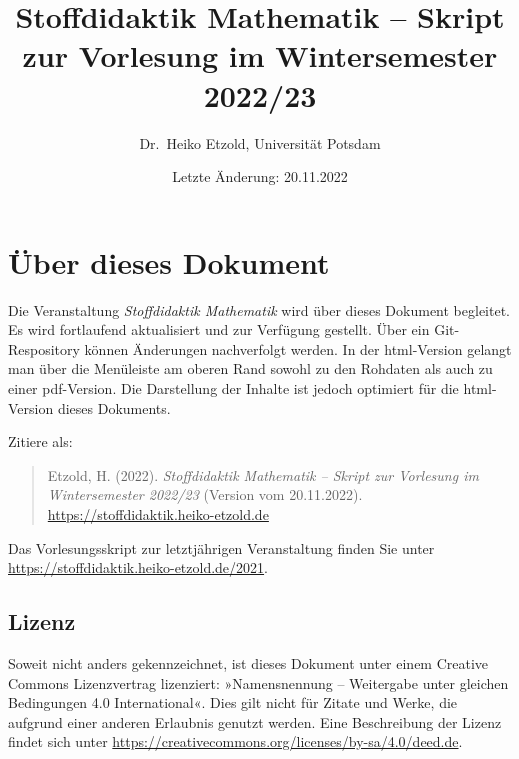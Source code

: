 \documentclass[
]{scrbook}
\title{Stoffdidaktik Mathematik -- Skript zur Vorlesung im Wintersemester 2022/23}
\author{Dr.~Heiko Etzold, Universität Potsdam}
\date{Letzte Änderung: 20.11.2022}
\makeatletter
\def\renewtheorem#1{%
  \expandafter\let\csname#1\endcsname\relax
  \expandafter\let\csname c@#1\endcsname\relax
  \gdef\renewtheorem@envname{#1}
  \renewtheorem@secpar
}
\def\renewtheorem@secpar{\@ifnextchar[{\renewtheorem@numberedlike}{\renewtheorem@nonumberedlike}}
\def\renewtheorem@numberedlike[#1]#2{\newtheorem{\renewtheorem@envname}[#1]{#2}}
\def\renewtheorem@nonumberedlike#1{
\def\renewtheorem@caption{#1}
\edef\renewtheorem@nowithin{\noexpand\newtheorem{\renewtheorem@envname}{\renewtheorem@caption}}
\renewtheorem@thirdpar
}
\def\renewtheorem@thirdpar{\@ifnextchar[{\renewtheorem@within}{\renewtheorem@nowithin}}
\def\renewtheorem@within[#1]{\renewtheorem@nowithin[#1]}
\theoremstyle{definition}
\theoremstyle{definition}
\theoremstyle{definition}
\theoremstyle{definition}
\theoremstyle{remark}
\makeatother
\begin{document}
\maketitle

% 

{
\hypersetup{linkcolor=}
\setcounter{tocdepth}{1}
\tableofcontents
}
\hypertarget{uxfcber-dieses-dokument}{%
\chapter*{Über dieses Dokument}\label{uxfcber-dieses-dokument}}

Die Veranstaltung \emph{Stoffdidaktik Mathematik} wird über dieses Dokument begleitet. Es wird fortlaufend aktualisiert und zur Verfügung gestellt. Über ein Git-Respository können Änderungen nachverfolgt werden. In der html-Version gelangt man über die Menüleiste am oberen Rand sowohl zu den Rohdaten als auch zu einer pdf-Version. Die Darstellung der Inhalte ist jedoch optimiert für die html-Version dieses Dokuments.

Zitiere als:

\begin{quote}
Etzold, H. (2022). \emph{Stoffdidaktik Mathematik -- Skript zur Vorlesung im Wintersemester 2022/23} (Version vom 20.11.2022). \url{https://stoffdidaktik.heiko-etzold.de}
\end{quote}

Das Vorlesungsskript zur letztjährigen Veranstaltung finden Sie unter \url{https://stoffdidaktik.heiko-etzold.de/2021}.

\hypertarget{lizenz}{%
\section*{Lizenz}\label{lizenz}}

Soweit nicht anders gekennzeichnet, ist dieses Dokument unter einem Creative Commons Lizenzvertrag lizenziert: »Namensnennung -- Weitergabe unter gleichen Bedingungen 4.0 International«. Dies gilt nicht für Zitate und Werke, die aufgrund einer anderen Erlaubnis genutzt werden.
Eine Beschreibung der Lizenz findet sich unter \url{https://creativecommons.org/licenses/by-sa/4.0/deed.de}.
\end{document}
